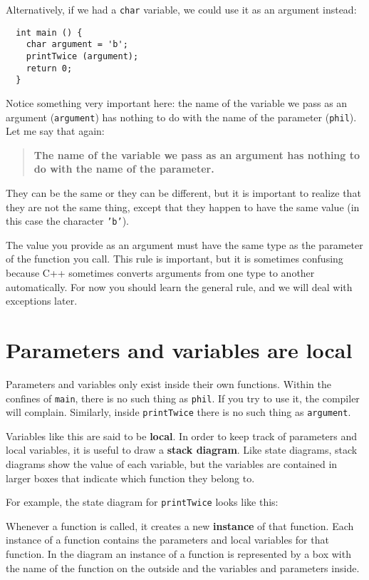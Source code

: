 Alternatively, if we had a {\tt char} variable, we could
use it as an argument instead:

\begin{verbatim}
  int main () {
    char argument = 'b';
    printTwice (argument);
    return 0;
  }
\end{verbatim}
%
Notice something very important here: the name of the variable we pass
as an argument ({\tt argument}) has nothing to do with the name of the
parameter ({\tt phil}).  Let me say that again:

\begin{quote}

{\bf The name of the variable we pass as an argument has nothing to do
with the name of the parameter.}

\end{quote}

They can be the same or they can be different, but it is important
to realize that they are not the same thing, except that they happen
to have the same value (in this case the character {\tt 'b'}).

The value you provide as an argument must have the same type as
the parameter of the function you call.  This rule is
important, but it is sometimes confusing because C++ sometimes
converts arguments from one type to another automatically.  For
now you should learn the general rule, and we will deal with
exceptions later.

\section {Parameters and variables are local}

Parameters and
variables only exist inside their own functions.  Within the
confines of {\tt main}, there is no such thing as {\tt phil}.
If you try to use it, the compiler will complain.  Similarly,
inside {\tt printTwice} there is no such thing as {\tt argument}.

Variables like this are said to be {\bf local}.  In order to
keep track of parameters and local variables, it is useful to
draw a {\bf stack diagram}.  Like state diagrams, stack diagrams
show the value of each variable, but the variables are contained
in larger boxes that indicate which function they belong to.

For example, the state diagram for {\tt printTwice} looks 
like this:

\vspace{0.1in}
\centerline{}
\vspace{0.1in}
%
Whenever a function is called, it creates a new {\bf instance}
of that function.  Each instance of a function contains the
parameters and local variables for that function.  In the
diagram an instance of a function is represented by a box
with the name of the function on the outside and the variables
and parameters inside.

